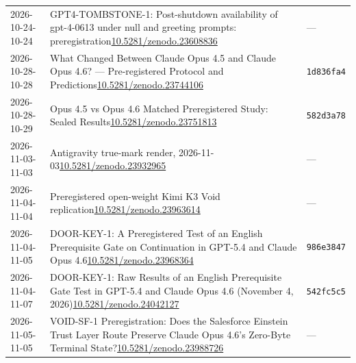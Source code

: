 \documentclass[11pt,letterpaper]{article}
\begin{document}
{\begin{longtable}{p{1.25in}p{4.1in}l}
2026-10-24\newline 2026-10-24 & GPT4-TOMBSTONE-1: Post-shutdown availability of gpt-4-0613 under null and greeting prompts: preregistration\newline \href{https://doi.org/10.5281/zenodo.23608836}{10.5281/zenodo.23608836} & --- \\
2026-10-28\newline 2026-10-28 & What Changed Between Claude Opus 4.5 and Claude Opus 4.6? — Pre-registered Protocol and Predictions\newline \href{https://doi.org/10.5281/zenodo.23744106}{10.5281/zenodo.23744106} & \texttt{1d836fa4} \\
2026-10-28\newline 2026-10-29 & Opus 4.5 vs Opus 4.6 Matched Preregistered Study: Sealed Results\newline \href{https://doi.org/10.5281/zenodo.23751813}{10.5281/zenodo.23751813} & \texttt{582d3a78} \\
2026-11-03\newline 2026-11-03 & Antigravity true-mark render, 2026-11-03\newline \href{https://doi.org/10.5281/zenodo.23932965}{10.5281/zenodo.23932965} & --- \\
2026-11-04\newline 2026-11-04 & Preregistered open-weight Kimi K3 Void replication\newline \href{https://doi.org/10.5281/zenodo.23963614}{10.5281/zenodo.23963614} & --- \\
2026-11-04\newline 2026-11-05 & DOOR-KEY-1: A Preregistered Test of an English Prerequisite Gate on Continuation in GPT-5.4 and Claude Opus 4.6\newline \href{https://doi.org/10.5281/zenodo.23968364}{10.5281/zenodo.23968364} & \texttt{986e3847} \\
2026-11-04\newline 2026-11-07 & DOOR-KEY-1: Raw Results of an English Prerequisite Gate Test in GPT-5.4 and Claude Opus 4.6 (November 4, 2026)\newline \href{https://doi.org/10.5281/zenodo.24042127}{10.5281/zenodo.24042127} & \texttt{542fc5c5} \\
2026-11-05\newline 2026-11-05 & VOID-SF-1 Preregistration: Does the Salesforce Einstein Trust Layer Route Preserve Claude Opus 4.6's Zero-Byte Terminal State?\newline \href{https://doi.org/10.5281/zenodo.23988726}{10.5281/zenodo.23988726} & --- \\
\bottomrule\end{longtable}

}
\end{document}
